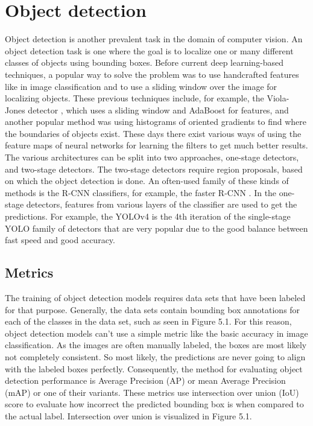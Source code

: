 \chapter{Object detection}
Object detection is another prevalent task in the domain of computer vision.
An object detection task is one where the goal is to localize one or many different classes of objects using bounding boxes.
Before current deep learning-based techniques, a popular way to solve the problem was to use handcrafted features like in image classification and to use a sliding window over the image for localizing objects.
These previous techniques include, for example, the Viola-Jones detector \citep{viola-jones}, which uses a sliding window and AdaBoost for features, and another popular method was using histograms of oriented gradients \citep{hogs} to find where the boundaries of objects exist.
These days there exist various ways of using the feature maps of neural networks for learning the filters to get much better results.
The various architectures can be split into two approaches, one-stage detectors, and two-stage detectors.
The two-stage detectors require region proposals, based on which the object detection is done.
An often-used family of these kinds of methods is the R-CNN classifiers, for example, the faster R-CNN \citep{faster-rcnn}.
In the one-stage detectors, features from various layers of the classifier are used to get the predictions.
For example, the YOLOv4 \citep{yolov4} is the 4th iteration of the single-stage YOLO family of detectors that are very popular due to the good balance between fast speed and good accuracy.

\section{Metrics}
The training of object detection models requires data sets that have been labeled for that purpose.
Generally, the data sets contain bounding box annotations for each of the classes in the data set, such as seen in Figure 5.1.
For this reason, object detection models can't use a simple metric like the basic accuracy in image classification.
As the images are often manually labeled, the boxes are most likely not completely consistent.
So most likely, the predictions are never going to align with the labeled boxes perfectly.
Consequently, the method for evaluating object detection performance is Average Precision (AP) or mean Average Precision (mAP) or one of their variants.
These metrics use intersection over union (IoU) score to evaluate how incorrect the predicted bounding box is when compared to the actual label. Intersection over union is visualized in Figure 5.1.

